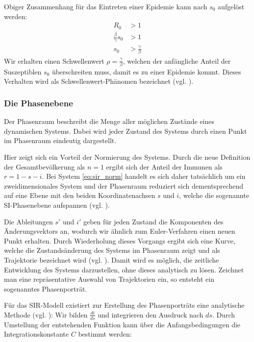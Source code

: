 \documentclass[../main.tex]{subfiles}
\begin{document}
        Obiger Zusammenhang für das Eintreten einer Epidemie kann nach $s_0$ aufgelöst werden:
        \begin{equation}
            \begin{aligned}
                R_0                     &> 1 \\
                \frac{\beta}{\gamma}s_0 &> 1 \\
                s_0                     &> \frac{\gamma}{\beta}
            \end{aligned}
        \end{equation}
        Wir erhalten einen Schwellenwert $\rho = \frac{\gamma}{\beta}$, welchen der anfängliche Anteil der Suszeptiblen $s_0$ überschreiten muss, damit es zu einer Epidemie kommt.
        Dieses Verhalten wird als Schwellenwert-Phänomen bezeichnet (vgl. \cite[S. 701]{KM27}).
        
        \subsubsection{Die Phasenebene}
        \label{sssec:phase_plane}
        Der Phasenraum beschreibt die Menge aller möglichen Zustände eines dynamischen Systems. Dabei wird jeder Zustand des Systems durch einen Punkt im Phasenraum eindeutig dargestellt.

        Hier zeigt sich ein Vorteil der Normierung des Systems. Durch die neue Definition der Gesamtbevölkerung als $n=1$ ergibt sich der Anteil der Immunen als $r=1-s-i$.
        Bei System \eqref{eq:sir_norm} handelt es sich daher tatsächlich um ein zweidimensionales System und der Phasenraum reduziert sich dementsprechend auf eine Ebene mit den beiden Koordinatenachsen $s$ und $i$, welche die sogenannte SI-Phasenebene aufspannen (vgl. \cite[S. 91]{Bri03}).

        Die Ableitungen $s'$ und $i'$ geben für jeden Zustand die Komponenten des Änderungsvektors an, wodurch wir ähnlich zum Euler-Verfahren einen neuen Punkt erhalten. Durch Wiederholung dieses Vorgangs ergibt sich eine Kurve, welche die Zustandsänderung des Systems im Phasenraum zeigt und als Trajektorie bezeichnet wird (vgl. \cite[S. 71]{Rob+07}). Damit wird es möglich, die zeitliche Entwicklung des Systems darzustellen, ohne dieses analytisch zu lösen. Zeichnet man eine repräsentative Auswahl von Trajektorien ein, so entsteht ein sogenanntes Phasenporträt.

        Für das SIR-Modell existiert zur Erstellung des Phasenporträts eine analytische Methode (vgl. \cite[S. 40]{Li18}): Wir bilden $\frac{di}{ds}$ und integrieren den Ausdruck nach $ds$. Durch Umstellung der entstehenden Funktion kann über die Anfangsbedingungen die Integrationskonstante $C$ bestimmt werden:
\end{document}
